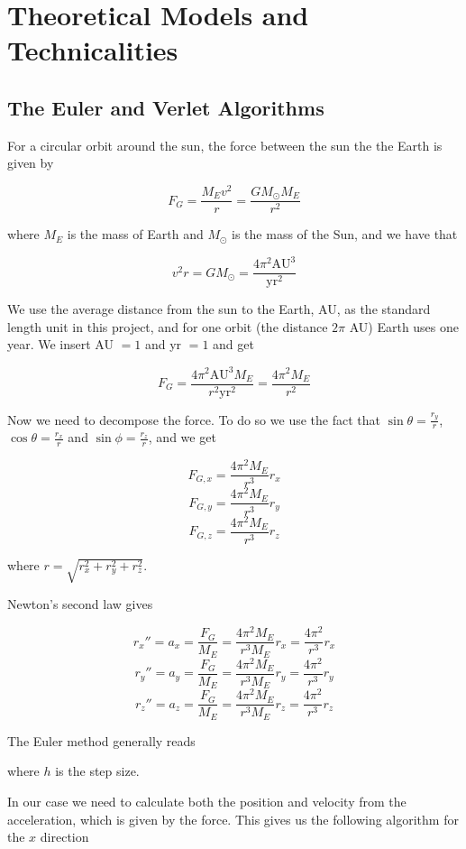 \documentclass{article}
\begin{document}
\section{Theoretical Models and Technicalities}

\subsection{The Euler and Verlet Algorithms}

For a circular orbit around the sun, the force between the sun the the Earth is given by

$$F_G=\frac{M_Ev^2}{r}=\frac{GM_{\odot}M_E}{r^2}$$

where $M_E$ is the mass of Earth and $M_{\odot}$ is the mass of the Sun, and we have that

$$v^2r=GM_{\odot}=\frac{4\pi^2\mathrm{AU}^3}{\mathrm{yr}^2}$$

We use the average distance from the sun to the Earth, AU, as the standard length unit in this project, and for one orbit (the distance $2\pi$ AU) Earth uses one year. We insert AU $=1$ and yr $=1$ and get

$$F_G=\frac{4\pi^2\mathrm{AU}^3M_E}{r^2\mathrm{yr}^2}=\frac{4\pi^2M_E}{r^2}$$


Now we need to decompose the force. To do so we use the fact that $\sin \theta=\frac{r_y}{r}$, $\cos \theta=\frac{r_x}{r}$ and $\sin\phi=\frac{r_z}{r}$, and we get

$$F_{G,x}=\frac{4\pi^2M_E}{r^3}r_x$$
$$F_{G,y}=\frac{4\pi^2M_E}{r^3}r_y$$
$$F_{G,z}=\frac{4\pi^2M_E}{r^3}r_z$$

where $r=\sqrt{r_x^2+r_y^2+r_z^2}$.

Newton's second law gives

$$r_x''=a_x=\frac{F_G}{M_E}=\frac{4\pi^2M_E}{r^3M_E}r_x=\frac{4\pi^2}{r^3}r_x$$
$$r_y''=a_y=\frac{F_G}{M_E}=\frac{4\pi^2M_E}{r^3M_E}r_y=\frac{4\pi^2}{r^3}r_y$$
$$r_z''=a_z=\frac{F_G}{M_E}=\frac{4\pi^2M_E}{r^3M_E}r_z=\frac{4\pi^2}{r^3}r_z$$

\vskip0.5cm
The Euler method generally reads
\vskip0.5cm
\begin{algorithm}[H]
\end{algorithm}
\vskip0.5cm

where $h$ is the step size.

In our case we need to calculate both the position and velocity from the acceleration, which is given by the force. This gives us the following algorithm for the $x$ direction
\end{document}
